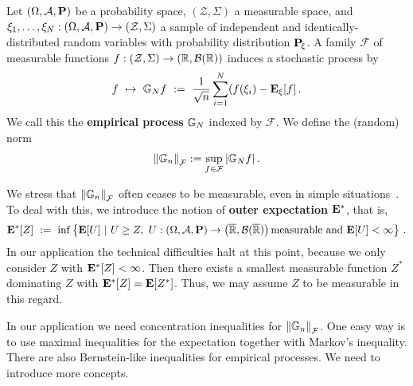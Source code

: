 Let 
$
  \left( 
    \Omega,
    \mathcal{A},
    \P
  \right)
$
be a probability space,
$
  \left( 
    \mathcal{Z},
    \Sigma
  \right)
$
a measurable space, and 
$
  \xi_1,\ldots,\xi_N
  :
  \left( 
    \Omega,
    \mathcal{A},
    \P
  \right)
  \to
  \left( 
    \mathcal{Z},
    \Sigma
  \right)
$
a sample 
of independent and identically-distributed
random variables
with probability distribution $\P_{\!\xi}$.
A family $\mathcal{F}$ of measurable functions 
$
  f:
  \left( 
    \mathcal{Z},
    \Sigma
  \right)
    \to
  \left( 
    \R,
    \mathcal{B}(\R)
  \right)
$
induces a stochastic process by
\begin{gather}
  f
  \ 
  \mapsto
  \ 
  \G_N f 
  \ 
  :=
  \ 
  \frac{1}{\sqrt{n}}
  \sum_{i=1}^{N} 
  (
    f(\xi_i)
    -
    \E_\xi[f]
  \,.
\end{gather}
We call this the  \textbf{empirical process} $\G_N$ indexed by $\mathcal{F}$.
We define the (random) norm
\begin{gather}
  \norm{\G_n}_\mathcal{F}
  :=
  \sup_
        { f \in \mathcal{F}}
        \left|
          \G_N f
        \right|
        .
\end{gather}
\begin{remark}
We stress that 
$
  \norm{\G_n}_\mathcal{F}
$
often ceases to be measurable, even in simple situations~\cite[page 3]{vaart2013}.
To deal with this, we introduce the notion of \textbf{outer expectation} $\E^*$, that is,
\begin{gather}
  \E^*[Z]
  \ 
  :=
  \ 
    \inf
  \left\{ 
    \E[U]
  \ 
  \lvert
  \ 
    U\ge Z,
    \ 
    U:
  \left( 
    \Omega,
    \mathcal{A},
    \P
  \right)
  \to 
  \left( 
    \overline{\R},
    \mathcal{B}(\overline{\R})
  \right)
  \text{measurable and}
  \ 
  \E[U]<\infty
  \right\}
  \,.
\end{gather}
In our application the technical difficulties halt at this point, because we only consider $Z$ with $\E^*[Z]<\infty$. Then there exists a smallest measurable function $Z^*$ dominating $Z$ with
$\E^*[Z]=\E[Z^*]$. Thus, we may assume $Z$ to be measurable in this regard.


\end{remark}
In our application we need concentration inequalities for 
$
  \norm{\G_n}_\mathcal{F}
$.
One easy way is to use maximal inequalities for the expectation together with Markov's inequality. There are also Bernstein-like inequalities for empirical processes. We need to introduce more concepts.

